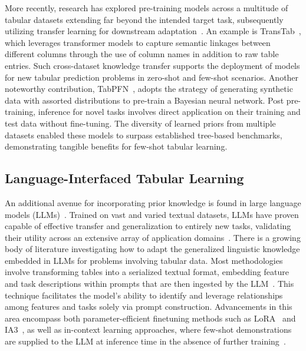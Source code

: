 More recently, research has explored pre-training models across a multitude of tabular datasets extending far beyond the intended target task, subsequently utilizing transfer learning for downstream adaptation~\cite{zhang2023generative,levin2022transfer,zhu2023xtab}. An example is TransTab~\cite{wang2022transtab}, which leverages transformer models to capture semantic linkages between different columns through the use of column names in addition to raw table entries. Such cross-dataset knowledge transfer supports the deployment of models for new tabular prediction problems in zero-shot and few-shot scenarios. Another noteworthy contribution, TabPFN~\cite{hollmann2022tabpfn}, adopts the strategy of generating synthetic data with assorted distributions to pre-train a Bayesian neural network. Post pre-training, inference for novel tasks involves direct application on their training and test data without fine-tuning. The diversity of learned priors from multiple datasets enabled these models to surpass established tree-based benchmarks, demonstrating tangible benefits for few-shot tabular learning.

\subsection{Language-Interfaced Tabular Learning} An additional avenue for incorporating prior knowledge is found in large language models (LLMs)~\cite{anil2023palm,openai2023gpt4}. Trained on vast and varied textual datasets, LLMs have proven capable of effective transfer and generalization to entirely new tasks, validating their utility across an extensive array of application domains~\cite{brown2020language}. There is a growing body of literature investigating how to adapt the generalized linguistic knowledge embedded in LLMs for problems involving tabular data. Most methodologies involve transforming tables into a serialized textual format, embedding feature and task descriptions within prompts that are then ingested by the LLM~\cite{dinh2022lift,hegselmann2023tabllm,wang2023anypredict}. This technique facilitates the model's ability to identify and leverage relationships among features and tasks solely via prompt construction. Advancements in this area encompass both parameter-efficient finetuning methods such as LoRA~\cite{hu2021lora} and IA3~\cite{liu2022few}, as well as in-context learning approaches, where few-shot demonstrations are supplied to the LLM at inference time in the absence of further training~\cite{dinh2022lift,hegselmann2023tabllm,nam2023semi,slack2023tablet}.

